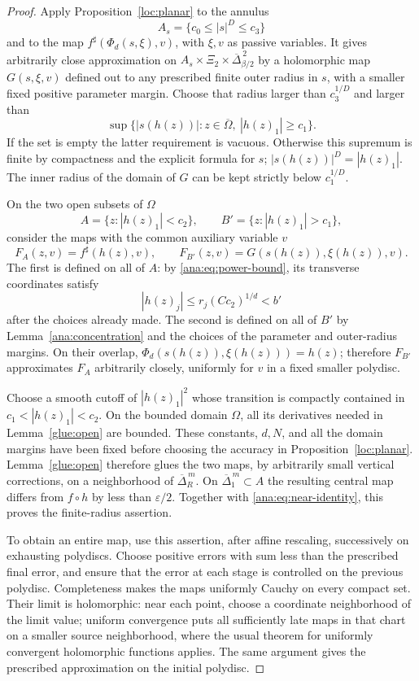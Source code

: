 \begin{proof}
Apply Proposition~\ref{loc:planar} to the annulus
\[
 A_s=\{c_0\leq |s|^D\leq c_3\}
\]
and to the map \(f^\sharp(\Phi_d(s,\xi),v)\), with \(\xi,v\)
as passive variables.  It gives arbitrarily close approximation
on \(A_s\times\Xi_2\times\overline\Delta_{\beta/2}^{\,2}\)
by a holomorphic map \(G(s,\xi,v)\) defined out to any prescribed
finite outer radius in \(s\), with a smaller fixed positive
parameter margin.  Choose that radius larger than \(c_3^{1/D}\)
and larger than
\[
 \sup\{|s(h(z))|:z\in\overline\Omega,\ |h(z)_1|\geq c_1\}.
\]
If the set is empty the latter requirement is vacuous.
Otherwise this supremum is finite by compactness and the explicit formula
for \(s\); \(|s(h(z))|^D=|h(z)_1|\).
The inner radius of the domain of \(G\) can be kept strictly below
\(c_1^{1/D}\).

On the two open subsets of \(\Omega\)
\[
 A=\{z:|h(z)_1|<c_2\},\qquad
 B'=\{z:|h(z)_1|>c_1\},
\]
consider the maps with the common auxiliary variable \(v\)
\[
 F_A(z,v)=f^\sharp(h(z),v),\qquad
 F_{B'}(z,v)=G(s(h(z)),\xi(h(z)),v).
\]
The first is defined on all of \(A\): by
\eqref{ana:eq:power-bound}, its transverse coordinates satisfy
\[
 |h(z)_j|\leq r_j(Cc_2)^{1/d}<b'
\]
after the choices already made.  The second is defined on all
of \(B'\) by Lemma~\ref{ana:concentration} and the choices of
the parameter and outer-radius margins.
On their overlap, \(\Phi_d(s(h(z)),\xi(h(z)))=h(z)\);
therefore \(F_{B'}\) approximates \(F_A\) arbitrarily closely,
uniformly for \(v\) in a fixed smaller polydisc.

Choose a smooth cutoff of \(|h(z)_1|^2\) whose transition is
compactly contained in \(c_1<|h(z)_1|<c_2\).
On the bounded domain \(\Omega\), all its derivatives needed in
Lemma~\ref{glue:open} are bounded.  These constants, \(d,N\),
and all the domain margins have been fixed before choosing the
accuracy in Proposition~\ref{loc:planar}.  Lemma~\ref{glue:open}
therefore glues the two maps, by arbitrarily small vertical
corrections, on a neighborhood of \(\overline\Delta_R^{\,m}\).
On \(\overline\Delta_1^{\,m}\subset A\) the resulting central
map differs from \(f\circ h\) by less than \(\varepsilon/2\).
Together with \eqref{ana:eq:near-identity}, this proves the
finite-radius assertion.

To obtain an entire map, use this assertion, after affine
rescaling, successively on exhausting polydiscs.  Choose positive
errors with sum less than the prescribed final error, and ensure
that the error at each stage is controlled on the previous
polydisc.  Completeness makes the maps uniformly Cauchy on every
compact set.  Their limit is holomorphic: near each point, choose
a coordinate neighborhood of the limit value; uniform convergence
puts all sufficiently late maps in that chart on a smaller source
neighborhood, where the usual theorem for uniformly convergent
holomorphic functions applies.  The same argument gives the
prescribed approximation on the initial polydisc.
\end{proof}
